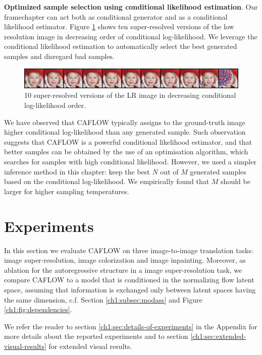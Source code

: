 \smallskip

\textbf{Optimized sample selection using conditional likelihood estimation}. \color{black}Our framechapter can act both as conditional generator and as a conditional likelihood estimator. Figure \ref{ch1:fig:decreasingloglikelihood} shows ten super-resolved versions of the low resolution image in decreasing order of conditional log-likelihood. We leverage the conditional likelihood estimation to automatically select the best generated samples and disregard bad samples. 

\begin{figure}[h!]
    \centering
    \includegraphics[width=\textwidth]{Chapter1/paper_graphs/10samples_decreasing_conditional_loglikelihood.png}
    \caption{10 super-resolved versions of the LR image in decreasing conditional log-likelihood order.}
    \label{ch1:fig:decreasingloglikelihood}
\end{figure}

We have observed that CAFLOW typically assigns to the ground-truth image higher conditional log-likelihood than any generated sample. Such observation suggests that CAFLOW is a powerful conditional likelihood estimator, and that better samples can be obtained by the use of an optimisation algorithm, which searches for samples with high conditional likelihood. However, we used a simpler inference method in this chapter: keep the best $N$ out of $M$ generated samples based on the conditional log-likelihood. We empirically found that $M$ should be larger for higher sampling temperatures.

\section{Experiments}\label{ch1:sec:numerics}
In this section we evaluate CAFLOW on three image-to-image translation tasks: image super-resolution, image colorization and image inpainting. Moreover, as ablation for the autoregressive structure in a image super-resolution task, we compare CAFLOW to a model that is conditioned in the normalizing flow latent space, assuming that information is exchanged only between latent spaces having the same dimension, c.f. Section \ref{ch1:subsec:modass} and Figure \ref{ch1:fig:dependencies}. 

We refer the reader to section \ref{ch1:sec:details-of-experiments} in the Appendix for more details about the reported experiments and to section \ref{ch1:sec:extended-visual-results} for extended visual results.

